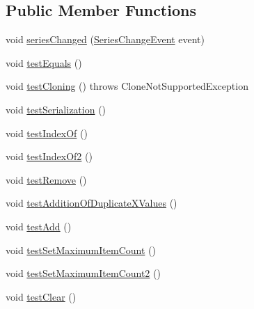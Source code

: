 \subsection*{Public Member Functions}
\begin{DoxyCompactItemize}
\item 
void \mbox{\hyperlink{classorg_1_1jfree_1_1data_1_1xy_1_1_vector_series_test_ab049ec8170566cf3bfe34c6ff1b47eed}{series\+Changed}} (\mbox{\hyperlink{classorg_1_1jfree_1_1data_1_1general_1_1_series_change_event}{Series\+Change\+Event}} event)
\item 
void \mbox{\hyperlink{classorg_1_1jfree_1_1data_1_1xy_1_1_vector_series_test_ac9046bf28e8cf4c83a0511e961f3201c}{test\+Equals}} ()
\item 
void \mbox{\hyperlink{classorg_1_1jfree_1_1data_1_1xy_1_1_vector_series_test_a22f6ba0336a6f96be40c0445d54bc1ac}{test\+Cloning}} ()  throws Clone\+Not\+Supported\+Exception 
\item 
void \mbox{\hyperlink{classorg_1_1jfree_1_1data_1_1xy_1_1_vector_series_test_aff5022579942e65cafa7dadeda8ac5f3}{test\+Serialization}} ()
\item 
void \mbox{\hyperlink{classorg_1_1jfree_1_1data_1_1xy_1_1_vector_series_test_ac70a575a1d33c9985699f8308fbf4a8d}{test\+Index\+Of}} ()
\item 
void \mbox{\hyperlink{classorg_1_1jfree_1_1data_1_1xy_1_1_vector_series_test_aa97e8c1205f23e7a50b876bacf935b65}{test\+Index\+Of2}} ()
\item 
void \mbox{\hyperlink{classorg_1_1jfree_1_1data_1_1xy_1_1_vector_series_test_a76e53e7c7b27a12ce120c69e5a8271da}{test\+Remove}} ()
\item 
void \mbox{\hyperlink{classorg_1_1jfree_1_1data_1_1xy_1_1_vector_series_test_a41e709698bf347f45fc24f5069434f34}{test\+Addition\+Of\+Duplicate\+X\+Values}} ()
\item 
void \mbox{\hyperlink{classorg_1_1jfree_1_1data_1_1xy_1_1_vector_series_test_a0b3647f0b927f774f406a93d5ffa56fa}{test\+Add}} ()
\item 
void \mbox{\hyperlink{classorg_1_1jfree_1_1data_1_1xy_1_1_vector_series_test_a8f28233f29c3f0b30ff2fa30e4b8ae50}{test\+Set\+Maximum\+Item\+Count}} ()
\item 
void \mbox{\hyperlink{classorg_1_1jfree_1_1data_1_1xy_1_1_vector_series_test_acd59fe58decdb3e3ec629db5fa04cfa3}{test\+Set\+Maximum\+Item\+Count2}} ()
\item 
void \mbox{\hyperlink{classorg_1_1jfree_1_1data_1_1xy_1_1_vector_series_test_af3e653b26f77a752ee7d34f311d0d38e}{test\+Clear}} ()
\end{DoxyCompactItemize}


